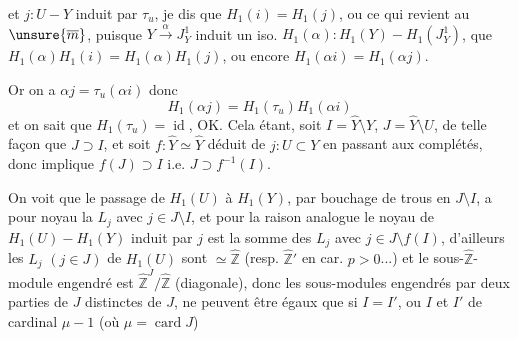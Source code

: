 et $j:U-Y$ induit par $\tau_u$, je dis que $H_1(i)=H_1(j)$, ou ce qui revient au $\unsure{\overline m}$, puisque $Y\xrightarrow{\alpha}J_Y^1$ induit un iso. $H_1(\alpha):H_1(Y)-H_1(J_Y^1)$, que $H_1(\alpha)H_1(i)=H_1(\alpha)H_1(j)$, ou encore $H_1(\alpha i)=H_1(\alpha j)$.

Or on a $\alpha j=\tau_u(\alpha i)$ donc 
\[
H_1(\alpha j)=H_1(\tau_u)H_1(\alpha i)
\]
et on sait que $H_1(\tau_u)=\operatorname{id}$, OK. Cela étant, soit $I=\widehat Y\setminus Y$, $J=\widehat Y\setminus U$, de telle façon que $J\supset I$, et soit $f:\widehat Y\simeq\widehat Y$ déduit de $j:U\subset Y$ en passant aux complétés, donc   implique $f(J)\supset I$ i.e. $J\supset f^{-1}(I)$.

On voit que le passage de $H_1(U)$ à $H_1(Y)$, par bouchage de trous en $J\setminus I$, a pour noyau la  $L_j$ avec $j\in J\setminus I$, et pour la raison analogue le noyau de $H_1(U)-H_1(Y)$ induit par $j$ est la somme des $L_j$ avec $j\in J\setminus f(I)$, d'ailleurs les $L_j$ $(j\in J)$ de $H_1(U)$ sont $\simeq\widehat{\mathbb Z}$ (resp. $\widehat{\mathbb Z}'$ en car. $p>0$...) et le sous-$\widehat{\mathbb Z}$-module engendré est $\widehat{\mathbb Z}^{J}/\widehat{\mathbb Z}$ (diagonale), donc  les sous-modules engendrés par deux parties  de $J$ distinctes de $J$, ne peuvent être égaux que si $I=I'$, ou $I$ et $I'$ de cardinal $\mu-1$ (où $\mu=\operatorname{card}J$)

